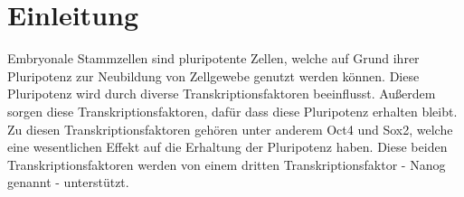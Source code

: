 \chapter{Einleitung}
\label{ch:intro}
Embryonale Stammzellen sind pluripotente Zellen, welche auf Grund ihrer Pluripotenz zur Neubildung von Zellgewebe genutzt werden können.
Diese Pluripotenz wird durch diverse Transkriptionsfaktoren beeinflusst. 
Außerdem sorgen diese Transkriptionsfaktoren, dafür dass diese Pluripotenz erhalten bleibt. 
Zu diesen Transkriptionsfaktoren gehören unter anderem Oct4 und Sox2, welche eine wesentlichen Effekt auf die Erhaltung der Pluripotenz haben.
Diese beiden Transkriptionsfaktoren werden von einem dritten Transkriptionsfaktor - Nanog genannt - unterstützt.
